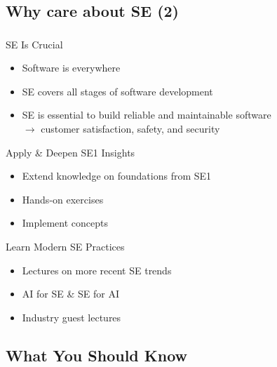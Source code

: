 \subsection{Why care about SE (2)}
\begin{frame}
	\frametitle{\myframetitle{}}
	\begin{fancycolumns}[columns=3, animation=keep,t]
		\begin{definition}{SE Is Crucial}
			\begin{itemize}
				\item Software is everywhere
				\item SE covers all stages of software development
				\item SE is essential to build reliable and maintainable software \\ $\rightarrow$ customer satisfaction, safety, and security
			\end{itemize}
		\end{definition}
		\nextcolumn
		\begin{definition}{Apply \& Deepen SE1 Insights}
			\begin{itemize}
				\item Extend knowledge on foundations from SE1
				\item Hands-on exercises
				\item Implement concepts
			\end{itemize}
		\end{definition}
		\nextcolumn
		\begin{definition}{Learn Modern SE Practices}
			\begin{itemize}
				\item Lectures on more recent SE trends
				\item AI for SE \& SE for AI
				\item Industry guest lectures
			\end{itemize}
		\end{definition}
	\end{fancycolumns}
\end{frame}

\subsection{What You Should Know}

